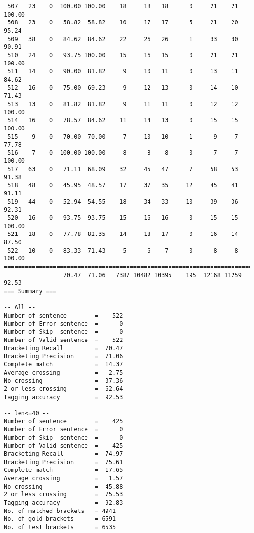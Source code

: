 \begin{verbatim}
 507   23    0  100.00 100.00    18     18   18      0     21    21   100.00
 508   23    0   58.82  58.82    10     17   17      5     21    20    95.24
 509   38    0   84.62  84.62    22     26   26      1     33    30    90.91
 510   24    0   93.75 100.00    15     16   15      0     21    21   100.00
 511   14    0   90.00  81.82     9     10   11      0     13    11    84.62
 512   16    0   75.00  69.23     9     12   13      0     14    10    71.43
 513   13    0   81.82  81.82     9     11   11      0     12    12   100.00
 514   16    0   78.57  84.62    11     14   13      0     15    15   100.00
 515    9    0   70.00  70.00     7     10   10      1      9     7    77.78
 516    7    0  100.00 100.00     8      8    8      0      7     7   100.00
 517   63    0   71.11  68.09    32     45   47      7     58    53    91.38
 518   48    0   45.95  48.57    17     37   35     12     45    41    91.11
 519   44    0   52.94  54.55    18     34   33     10     39    36    92.31
 520   16    0   93.75  93.75    15     16   16      0     15    15   100.00
 521   18    0   77.78  82.35    14     18   17      0     16    14    87.50
 522   10    0   83.33  71.43     5      6    7      0      8     8   100.00
============================================================================
                 70.47  71.06   7387 10482 10395    195  12168 11259    92.53
=== Summary ===

-- All --
Number of sentence        =    522
Number of Error sentence  =      0
Number of Skip  sentence  =      0
Number of Valid sentence  =    522
Bracketing Recall         =  70.47
Bracketing Precision      =  71.06
Complete match            =  14.37
Average crossing          =   2.75
No crossing               =  37.36
2 or less crossing        =  62.64
Tagging accuracy          =  92.53

-- len<=40 --
Number of sentence        =    425
Number of Error sentence  =      0
Number of Skip  sentence  =      0
Number of Valid sentence  =    425
Bracketing Recall         =  74.97
Bracketing Precision      =  75.61
Complete match            =  17.65
Average crossing          =   1.57
No crossing               =  45.88
2 or less crossing        =  75.53
Tagging accuracy          =  92.83
No. of matched brackets   = 4941
No. of gold brackets      = 6591
No. of test brackets      = 6535

\end{verbatim}

\normalsize

